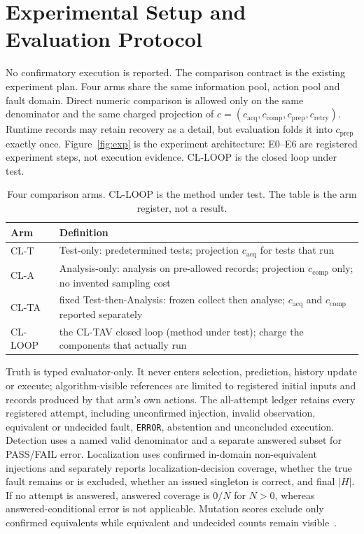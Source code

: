 \section{Experimental Setup and Evaluation Protocol}
\label{sec:setup}

No confirmatory execution is reported. The comparison contract is the existing
experiment plan. Four arms share the same information pool, action pool and
fault domain. Direct numeric comparison is allowed only on the same denominator
and the same charged projection of
\(c=(c_{\mathrm{acq}},c_{\mathrm{comp}},c_{\mathrm{prep}},c_{\mathrm{retry}})\).
Runtime records may retain recovery as a detail, but evaluation folds it into
\(c_{\mathrm{prep}}\) exactly once. Figure~\ref{fig:exp} is the experiment
architecture: E0--E6 are registered experiment steps, not execution evidence.
CL-LOOP is the closed loop under test.

\begin{table}[!t]
\centering
\caption{Four comparison arms. CL-LOOP is the method under test. The table is
the arm register, not a result.}
\label{tab:arms}
\footnotesize
\begin{tabular}{@{}p{}p{}@{}}
\hline
Arm & Definition \\
\hline
CL-T & Test-only: predetermined tests; projection \(c_{\mathrm{acq}}\) for tests that run \\
CL-A & Analysis-only: analysis on pre-allowed records; projection \(c_{\mathrm{comp}}\) only; no invented sampling cost \\
CL-TA & fixed Test-then-Analysis: frozen collect then analyse; \(c_{\mathrm{acq}}\) and \(c_{\mathrm{comp}}\) reported separately \\
CL-LOOP & the CL-TAV closed loop (method under test); charge the components that actually run \\
\hline
\end{tabular}
\end{table}

Truth is typed evaluator-only. It never enters selection, prediction, history
update or execute; algorithm-visible references are limited to registered
initial inputs and records produced by that arm's own actions. The all-attempt
ledger retains every registered attempt, including unconfirmed injection,
invalid observation, equivalent or undecided fault, \texttt{ERROR}, abstention
and unconcluded execution. Detection uses a named valid denominator and a
separate answered subset for PASS/FAIL error. Localization uses confirmed
in-domain non-equivalent injections and separately reports
localization-decision coverage, whether the true fault remains or is excluded,
whether an issued singleton is correct, and final \(|H|\). If no attempt is
answered, answered coverage is \(0/N\) for \(N>0\), whereas
answered-conditional error is not applicable. Mutation scores exclude only
confirmed equivalents while equivalent and undecided counts remain
visible~\cite{jia2011,gruen2009}.

